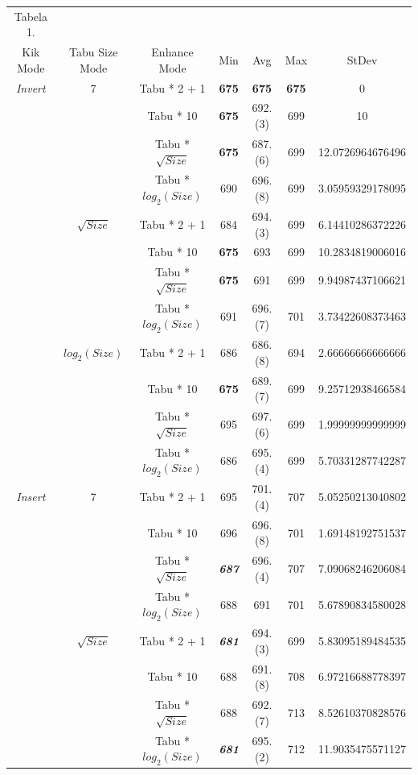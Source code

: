 \documentclass{article}
\begin{document}
\begin{table}[h!]
	\centering
	\begin{tabular}{c|c|c||c|c|c|c}
	Tabela 1.\\
	Kik Mode & Tabu Size Mode & Enhance Mode & Min & Avg & Max & StDev \\
	\hline
	\textit{Invert} & 7 & Tabu * 2 + 1 & \textbf{675} & \textbf{675} & \textbf{675} & 0 \\
	 &  & Tabu * 10 & \textbf{675} & 692.(3) & 699 & 10 \\
	 &  & Tabu * $\sqrt{Size}$ & \textbf{675} & 687.(6) & 699 & 12.0726964676496 \\
	 &  & Tabu * $log_2(Size)$ & 690 & 696.(8) & 699 & 3.05959329178095 \\
	\cline{2-7}
	 & $\sqrt{Size}$ & Tabu * 2 + 1 & 684 & 694.(3) & 699 & 6.14410286372226 \\
	 &  & Tabu * 10 & \textbf{675} & 693 & 699 & 10.2834819006016 \\
	 &  & Tabu * $\sqrt{Size}$ & \textbf{675} & 691 & 699 & 9.94987437106621 \\
	 &  & Tabu * $log_2(Size)$ & 691 & 696.(7) & 701 & 3.73422608373463 \\
	\cline{2-7}
	 & $log_2(Size)$ & Tabu * 2 + 1 & 686 & 686.(8) & 694 & 2.66666666666666 \\
	 &  & Tabu * 10 & \textbf{675} & 689.(7) & 699 & 9.25712938466584 \\
	 &  & Tabu * $\sqrt{Size}$ & 695 & 697.(6) & 699 & 1.99999999999999 \\
	 &  & Tabu * $log_2(Size)$ & 686 & 695.(4) & 699 & 5.70331287742287 \\
	\hline
	\textit{Insert} & 7 & Tabu * 2 + 1 & 695 & 701.(4) & 707 & 5.05250213040802 \\
	 &  & Tabu * 10 & 696 & 696.(8) & 701 & 1.69148192751537 \\
	 &  & Tabu * $\sqrt{Size}$ & \textbf{\textit{687}} & 696.(4) & 707 & 7.09068246206084 \\
	 &  & Tabu * $log_2(Size)$ & 688 & 691 & 701 & 5.67890834580028 \\
	\cline{2-7}
	 & $\sqrt{Size}$ & Tabu * 2 + 1 & \textbf{\textit{681}} & 694.(3) & 699 & 5.83095189484535 \\
	 &  & Tabu * 10 & 688 & 691.(8) & 708 & 6.97216688778397 \\
	 &  & Tabu * $\sqrt{Size}$ & 688 & 692.(7) & 713 & 8.52610370828576 \\
	 &  & Tabu * $log_2(Size)$ & \textbf{\textit{681}} & 695.(2) & 712 & 11.9035475571127 \\

\end{tabular}
\end{table}
\end{document}
